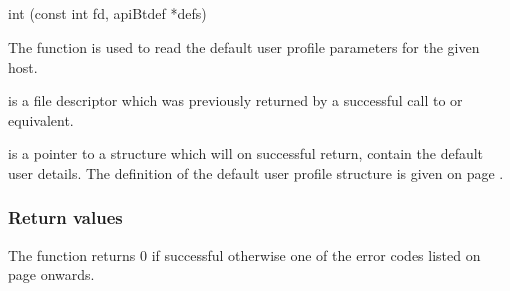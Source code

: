 \subsection{\funcnameXBgetbtd{}}

\begin{expara}

int \funcnameXBgetbtd{}(const int fd, apiBtdef *defs)

\end{expara}

The function \funcXBgetbtd{} is used to read the
default user profile parameters for the given host.

 is a file descriptor which was previously
returned by a successful call to \funcXBopen{} or equivalent.

 is a pointer to a structure which will on
successful return, contain the default user details. The definition of
the default user profile structure is given on page
\pageref{bkm:Defaultuser}.

\subsubsection{Return values}
The function returns 0 if successful otherwise one of the error codes
listed on page \pageref{errorcodes} onwards.

